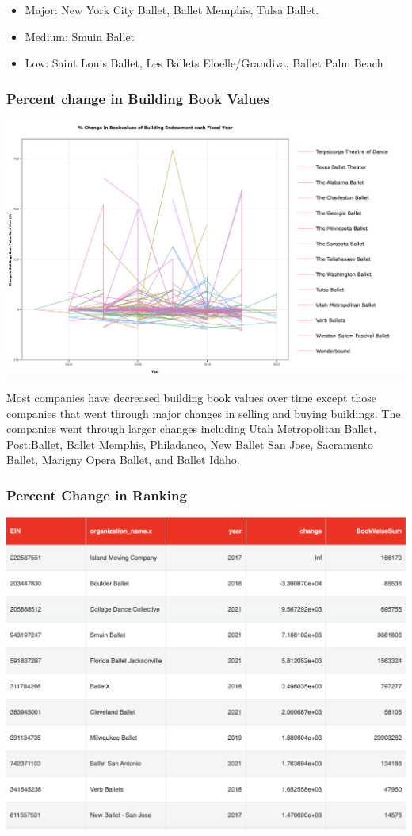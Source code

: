 \documentclass[Dance Data
Project,article,submit,moreauthors,pdftex]{mdpi}
\providecommand{\tightlist}{%
  \setlength{\itemsep}{0pt}\setlength{\parskip}{0pt}}
\begin{document}
\begin{itemize}
\tightlist
\item
  Major: New York City Ballet, Ballet Memphis, Tulsa Ballet.\\
\item
  Medium: Smuin Ballet\\
\item
  Low: Saint Louis Ballet, Les Ballets Eloelle/Grandiva, Ballet Palm
  Beach
\end{itemize}

\hypertarget{percent-change-in-building-book-values}{%
\subsubsection{Percent change in Building Book
Values}\label{percent-change-in-building-book-values}}

\includegraphics[width=0.9\linewidth,]{../images/percentage_building}

Most companies have decreased building book values over time except
those companies that went through major changes in selling and buying
buildings. The companies went through larger changes including Utah
Metropolitan Ballet, Post:Ballet, Ballet Memphis, Philadanco, New Ballet
San Jose, Sacramento Ballet, Marigny Opera Ballet, and Ballet Idaho.

\hypertarget{percent-change-in-ranking}{%
\subsubsection{Percent Change in
Ranking}\label{percent-change-in-ranking}}

\includegraphics[width=0.6\linewidth,]{../images/percent_change_ranking}
\end{document}
